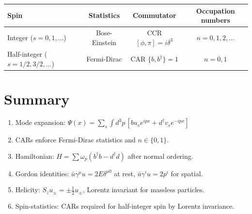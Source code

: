 \begin{center}
\begin{tabular}{l|c|c|c}
Spin & Statistics & Commutator & Occupation numbers \\ \hline
Integer ($s=0,1,\dots$) & Bose-Einstein & CCR $[\phi,\pi]=i\delta^3$ & $n=0,1,2,\dots$ \\
Half-integer ($s=1/2,3/2,\dots$) & Fermi-Dirac & CAR $\{b,b^\dagger\}=1$ & $n=0,1$ \\
\end{tabular}
\end{center}

\vfill
\section*{Summary}

\begin{enumerate}
\item Mode expansion: $\Psi(x)=\sum_s\int\!d^3p\,[bu_s e^{ipx}+d^\dagger v_s e^{-ipx}]$
\item CARs enforce Fermi-Dirac statistics and $n\in\{0,1\}$.
\item Hamiltonian: $H=\sum\omega_p(b^\dagger b-d^\dagger d)$ after normal ordering.
\item Gordon identities: $\bar u\gamma^\mu u = 2E\delta^{\mu0}$ at rest, $\bar u\gamma^i u=2p^i$ for spatial.
\item Helicity: $S_z u_\pm = \pm\frac{1}{2}u_\pm$, Lorentz invariant for massless particles.
\item Spin-statistics: CARs required for half-integer spin by Lorentz invariance.
\end{enumerate}
